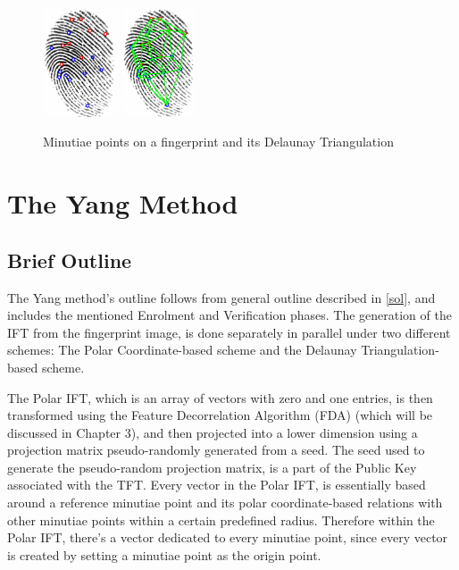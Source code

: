 \documentclass[fyp]{socreport}
\begin{document}
\begin{figure}[H]
	\centering
	\includegraphics[width=0.2\textwidth]
	{minutiae_points}
	\includegraphics[width=0.191\textwidth]
	{minutiae_del}
	\caption{Minutiae points on a fingerprint and its Delaunay Triangulation}
\end{figure}

\section{The Yang Method}
\subsection{Brief Outline}
The Yang method's outline follows from general outline described in \ref{sol}, and includes the mentioned Enrolment and Verification phases. The generation of the IFT from the fingerprint image, is done separately in parallel under two different schemes: The Polar Coordinate-based scheme and the Delaunay Triangulation-based scheme.

The Polar IFT, which is an array of vectors with zero and one entries, is then transformed using the Feature Decorrelation Algorithm (FDA) (which will be discussed in Chapter 3), and then projected into a lower dimension using a projection matrix pseudo-randomly generated from a seed. The seed used to generate the pseudo-random projection matrix, is a part of the Public Key associated with the TFT. Every vector in the Polar IFT, is essentially based around a reference minutiae point and its polar coordinate-based relations with other minutiae points within a certain predefined radius. Therefore within the Polar IFT, there's a vector dedicated to every minutiae point, since every vector is created by setting a minutiae point as the origin point.
\end{document}
